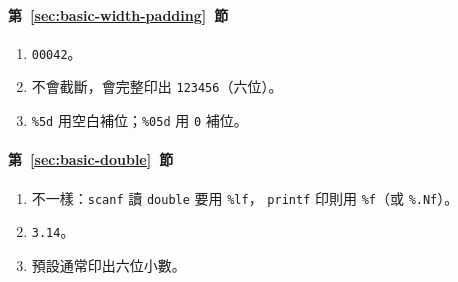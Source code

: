 \paragraph{第~\ref{sec:basic-width-padding}~節}
\begin{enumerate}
\item \texttt{00042}。
\item 不會截斷，會完整印出 \texttt{123456}（六位）。
\item \texttt{\%5d} 用空白補位；\texttt{\%05d} 用 \texttt{0} 補位。
\end{enumerate}

\paragraph{第~\ref{sec:basic-double}~節}
\begin{enumerate}
\item 不一樣：\texttt{scanf} 讀 \texttt{double} 要用 \texttt{\%lf}，
\texttt{printf} 印則用 \texttt{\%f}（或 \texttt{\%.Nf}）。
\item \texttt{3.14}。
\item 預設通常印出六位小數。
\end{enumerate}
